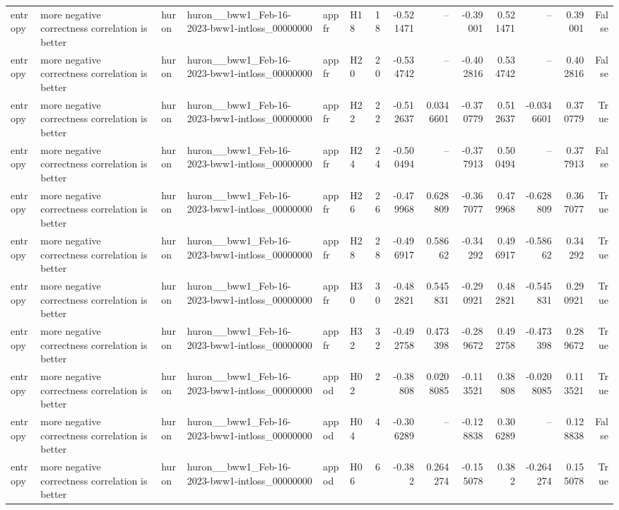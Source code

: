 \begin{longtable}{llllllrrrrrrrr}
entropy & more negative correctness correlation is better & huron & huron\_\_bww1\_Feb-16-2023-bww1-intloss\_00000000 & appfr & H18 & 18 & -0.521471 & -- & -0.39001 & 0.521471 & -- & 0.39001 & False \\
entropy & more negative correctness correlation is better & huron & huron\_\_bww1\_Feb-16-2023-bww1-intloss\_00000000 & appfr & H20 & 20 & -0.534742 & -- & -0.402816 & 0.534742 & -- & 0.402816 & False \\
entropy & more negative correctness correlation is better & huron & huron\_\_bww1\_Feb-16-2023-bww1-intloss\_00000000 & appfr & H22 & 22 & -0.512637 & 0.0346601 & -0.370779 & 0.512637 & -0.0346601 & 0.370779 & True \\
entropy & more negative correctness correlation is better & huron & huron\_\_bww1\_Feb-16-2023-bww1-intloss\_00000000 & appfr & H24 & 24 & -0.500494 & -- & -0.377913 & 0.500494 & -- & 0.377913 & False \\
entropy & more negative correctness correlation is better & huron & huron\_\_bww1\_Feb-16-2023-bww1-intloss\_00000000 & appfr & H26 & 26 & -0.479968 & 0.628809 & -0.367077 & 0.479968 & -0.628809 & 0.367077 & True \\
entropy & more negative correctness correlation is better & huron & huron\_\_bww1\_Feb-16-2023-bww1-intloss\_00000000 & appfr & H28 & 28 & -0.496917 & 0.58662 & -0.34292 & 0.496917 & -0.58662 & 0.34292 & True \\
entropy & more negative correctness correlation is better & huron & huron\_\_bww1\_Feb-16-2023-bww1-intloss\_00000000 & appfr & H30 & 30 & -0.482821 & 0.545831 & -0.290921 & 0.482821 & -0.545831 & 0.290921 & True \\
entropy & more negative correctness correlation is better & huron & huron\_\_bww1\_Feb-16-2023-bww1-intloss\_00000000 & appfr & H32 & 32 & -0.492758 & 0.473398 & -0.289672 & 0.492758 & -0.473398 & 0.289672 & True \\
entropy & more negative correctness correlation is better & huron & huron\_\_bww1\_Feb-16-2023-bww1-intloss\_00000000 & appod & H02 & 2 & -0.38808 & 0.0208085 & -0.113521 & 0.38808 & -0.0208085 & 0.113521 & True \\
entropy & more negative correctness correlation is better & huron & huron\_\_bww1\_Feb-16-2023-bww1-intloss\_00000000 & appod & H04 & 4 & -0.306289 & -- & -0.128838 & 0.306289 & -- & 0.128838 & False \\
entropy & more negative correctness correlation is better & huron & huron\_\_bww1\_Feb-16-2023-bww1-intloss\_00000000 & appod & H06 & 6 & -0.382 & 0.264274 & -0.155078 & 0.382 & -0.264274 & 0.155078 & True \\

\end{longtable}
